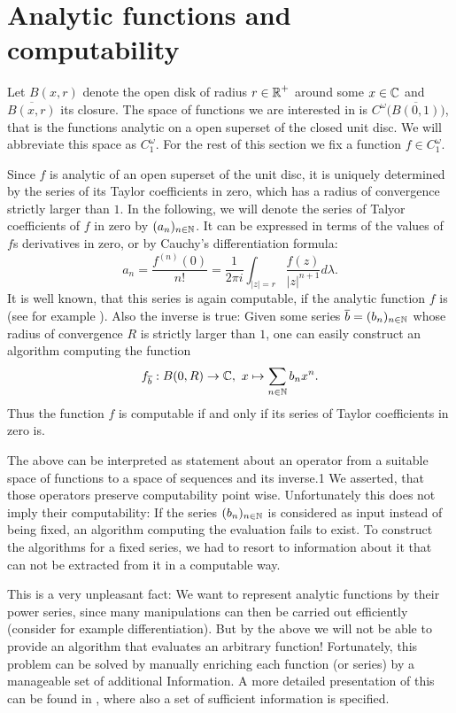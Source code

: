 \section{Analytic functions and computability}\label{sec: Analytic functions and computability}

	Let $B(x,r)$ denote the open disk of radius $r\in\operatorname{\mathbb{R}}^+$ around some $x\in \operatorname{\mathbb{C}}$ and $\overline{B(x,r)}$ its closure. The space of functions we are interested in is $C^\omega\big(\overline{B(0,1)}\big)$, that is the functions analytic on a open superset of the closed unit disc. We will abbreviate this space as $C^\omega_1$. For the rest of this section we fix a function $f\in C^\omega_1$.

	Since $f$ is analytic of an open superset of the unit disc, it is uniquely determined by the series of its Taylor coefficients in zero, which has a radius of convergence strictly larger than $1$. In the following, we will denote the series of Talyor coefficients of $f$ in zero by $(a_n)_{n\in \operatorname{\mathbb{N}}}$. It can be expressed in terms of the values of $f$s derivatives in zero, or by Cauchy's differentiation formula:
	\[ a_n = \frac{f^{(n)}(0)}{n!} = \frac 1 {2\pi i}\int_{|z| = r} \frac{f(z)}{|z|^{n+1}} d\lambda. \]
	It is well known, that this series is again computable, if the analytic function $f$ is (see for example \cite[Chapter 1.2, Proposition 1]{MR1005942}). Also the inverse is true: Given some series $\overline b = (b_n)_{n\in \operatorname{\mathbb{N}}}$ whose radius of convergence $R$ is strictly larger than $1$, one can easily construct an algorithm computing the function
	\[ f_{\overline b}: B(0,R) \to \operatorname{\mathbb{C}}, ~ x\mapsto \sum_{n\in \operatorname{\mathbb{N}}} b_n x^n. \]
	Thus the function $f$ is computable if and only if its series of Taylor coefficients in zero is.

	The above can be interpreted as statement about an operator from a suitable space of functions to a space of sequences and its inverse.1 We asserted, that those operators preserve computability point wise. Unfortunately this does not imply their computability: If the series $(b_n)_{n\in \operatorname{\mathbb{N}}}$ is considered as input instead of being fixed, an algorithm computing the evaluation fails to exist. To construct the algorithms for a fixed series, we had to resort to information about it that can not be extracted from it in a computable way.

	This is a very unpleasant fact: We want to represent analytic functions by their power series, since many manipulations can then be carried out efficiently (consider for example differentiation). But by the above we will not be able to provide an algorithm that evaluates an arbitrary function! Fortunately, this problem can be solved by manually enriching each function (or series) by a manageable set of additional Information. A more detailed presentation of this can be found in \cite{Mue95}, where also a set of sufficient information is specified.

